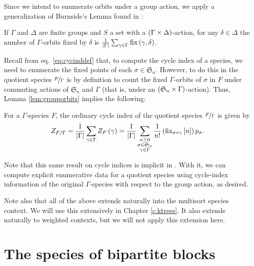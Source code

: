 \documentclass[sectionflow,singlespace,twoside,boldmathhdr]{brandiss} %
\numberwithin{section}{chapter}
\numberwithin{figure}{chapter}
\begin{document}
Since we intend to enumerate orbits under a group action, we apply a generalization of Burnside's Lemma found in \cite[Lemma 5]{gessel:laginvspec}:
\begin{lemma}
  \label{lem:grouporbits}
  If $\Gamma$ and $\Delta$ are finite groups and $S$ a set with a $\left( {\Gamma \times \Delta} \right)$-action, for any $\delta \in \Delta$ the number of $\Gamma$-orbits fixed by $\delta$ is $\frac{1}{\left\vert {\Gamma} \right\vert} \sum_{\gamma \in \Gamma} \operatorname{fix} \left( {\gamma, \delta} \right)$.
\end{lemma}

Recall from eq.\ \eqref{eq:cycinddef} that, to compute the cycle index of a species, we need to enumerate the fixed points of each $\sigma \in \mathfrak{S}_{n}$.
However, to do this in the quotient species $\nicefrac{F}{\Gamma}$ is by definition to count the fixed $\Gamma$-orbits of $\sigma$ in $F$ under commuting actions of $\mathfrak{S}_{n}$ and $\Gamma$ (that is, under an $\left( {\mathfrak{S}_{n} \times \Gamma} \right)$-action).
Thus, Lemma \ref{lem:grouporbits} implies the following:
\begin{theorem}\label{thm:qsci}
  For a $\Gamma$-species $F$, the ordinary cycle index of the quotient species $\nicefrac{F}{\Gamma}$ is given by 
  \begin{equation}
    \label{eq:quotcycind}
    Z_{F / \Gamma} = \frac{1}{\left\vert {\Gamma} \right\vert} \sum_{\gamma \in \Gamma} Z_{F} \left( {\gamma} \right) = \frac{1}{\left\vert {\Gamma} \right\vert} \sum_{\substack{n \geq 0 \\ \sigma \in \mathfrak{S}_{n} \\ \gamma \in \Gamma}} \frac{1}{n!} \left( {\operatorname{fix}_{\sigma \circ \gamma} \left[ {n} \right]} \right) p_{\sigma}.
  \end{equation}
\end{theorem}
Note that this same result on cycle indices is implicit in \cite[\S 2.2.3]{bous:species}.
With it, we can compute explicit enumerative data for a quotient species using cycle-index information of the original $\Gamma$-species with respect to the group action, as desired.

Note also that all of the above extends naturally into the multisort species context.
We will use this extensively in Chapter \ref{c:ktrees}.
It also extends naturally to weighted contexts, but we will not apply this extension here.

\chapter{The species of bipartite blocks}\label{c:bpblocks}
\end{document}

